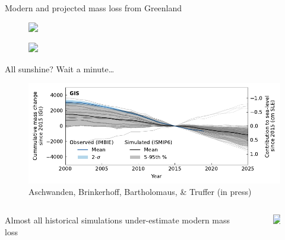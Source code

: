 \documentclass[hide notes,intlimits]{beamer}
\begin{document}
\begin{frame}{Modern and projected mass loss from Greenland}
  \begin{figure}
    \includegraphics<1>[width=3cm]{ismip6_logo}
  \end{figure}
  \begin{figure}
    \includegraphics<1>[width=\textwidth]{ar6-fig17-no-zoom}
  \end{figure}
\end{frame}

\begin{frame}{All sunshine? Wait a minute\ldots}
  \begin{figure}
    \includegraphics[width=\textwidth]{GIS_hist_with_obs}
    \caption{Aschwanden, Brinkerhoff, Bartholomaus, \& Truffer (in press)}
  \end{figure}
  \begin{columns}[c]
    \begin{column}{.5\textwidth}
      \begin{minipage}[t][.5\textheight][t]{\textwidth}
        \alert{Almost all historical simulations under-estimate modern mass loss}
      \end{minipage}
    \end{column}
    \begin{column}{.25\textwidth}
      \begin{minipage}[t][.5\textheight][t]{\textwidth}
        \begin{figure}
          \includegraphics<2>[width=1.8cm]{brain_thinking}
        \end{figure}
      \end{minipage}
    \end{column}
  \end{columns}
\end{frame}
\end{document}
